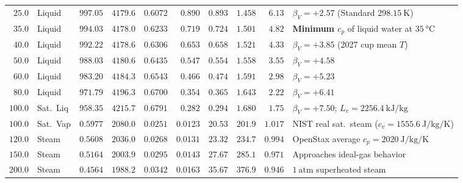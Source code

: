 \begin{center}
\begin{tabularx}{\linewidth}{@{}r l r r r r r r r X@{}}
$25.0$ & Liquid & $997.05$ & $4179.6$ & $0.6072$ & $0.890$ & $0.893$ & $1.458$ & $6.13$ & $\beta_V = +2.57$ (Standard $\SI{298.15}{\kelvin}$) \\
$35.0$ & Liquid & $994.03$ & $\mathbf{4178.0}$ & $0.6233$ & $0.719$ & $0.724$ & $1.501$ & $4.82$ & \textbf{Minimum $c_p$} of liquid water at $\SI{35}{\celsius}$ \\
$40.0$ & Liquid & $992.22$ & $4178.6$ & $0.6306$ & $0.653$ & $0.658$ & $1.521$ & $4.33$ & $\beta_V = +3.85$ (2027 cup mean $T$) \\
$50.0$ & Liquid & $988.03$ & $4180.6$ & $0.6435$ & $0.547$ & $0.554$ & $1.558$ & $3.55$ & $\beta_V = +4.58$ \\
$60.0$ & Liquid & $983.20$ & $4184.3$ & $0.6543$ & $0.466$ & $0.474$ & $1.591$ & $2.98$ & $\beta_V = +5.23$ \\
$80.0$ & Liquid & $971.79$ & $4196.3$ & $0.6700$ & $0.354$ & $0.365$ & $1.643$ & $2.22$ & $\beta_V = +6.41$ \\
$100.0$ & Sat.\ Liq & $958.35$ & $4215.7$ & $0.6791$ & $0.282$ & $0.294$ & $1.680$ & $1.75$ & $\beta_V = +7.50$; $L_v = \SI{2256.4}{\kilo\joule\per\kilogram}$ \\\midrule
$100.0$ & Sat.\ Vap & $0.5977$ & $\mathbf{2080.0}$ & $0.0251$ & $0.0123$ & $20.53$ & $201.9$ & $1.017$ & NIST real sat.\ steam ($c_v = \SI{1555.6}{\joule\per\kilogram\per\kelvin}$) \\
$120.0$ & Steam & $0.5608$ & $2036.0$ & $0.0268$ & $0.0131$ & $23.32$ & $234.7$ & $0.994$ & OpenStax average $c_p = \SI{2020}{\joule\per\kilogram\per\kelvin}$ \\
$150.0$ & Steam & $0.5164$ & $2003.9$ & $0.0295$ & $0.0143$ & $27.67$ & $285.1$ & $0.971$ & Approaches ideal-gas behavior \\
$200.0$ & Steam & $0.4564$ & $1988.2$ & $0.0342$ & $0.0163$ & $35.67$ & $376.9$ & $0.946$ & $\SI{1}{\text{atm}}$ superheated steam \\\bottomrule
\end{tabularx}
\end{center}

